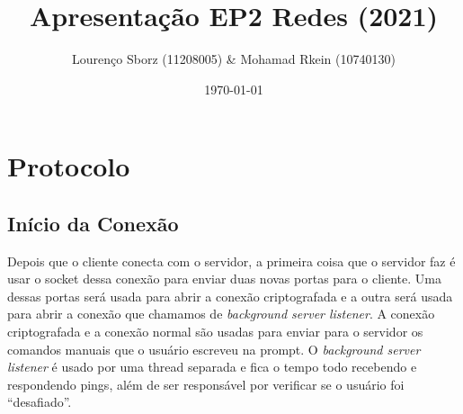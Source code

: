 \documentclass[12pt]{beamer}
\title{Apresentação EP2 Redes (2021)}
\author{Lourenço Sborz (11208005) \& Mohamad Rkein (10740130)}
\date{\today}
\begin{document}
\begin{frame}
  \titlepage{}
\end{frame}
\begin{frame}
  \tableofcontents
\end{frame}

\section{Protocolo}

\subsection{Início da Conexão}
\begin{frame}
  Depois que o cliente conecta com o servidor, a primeira coisa que o servidor faz é usar o socket dessa conexão para enviar duas novas portas para o cliente. Uma dessas portas será usada para abrir a conexão criptografada e a outra será usada para abrir a conexão que chamamos de \textit{background server listener}. A conexão criptografada e a conexão normal são usadas para enviar para o servidor os comandos manuais que o usuário escreveu na prompt. O \textit{background server listener} é usado por uma thread separada e fica o tempo todo recebendo e respondendo pings, além de ser responsável por verificar se o usuário foi ``desafiado''.
\end{frame}
\end{document}
